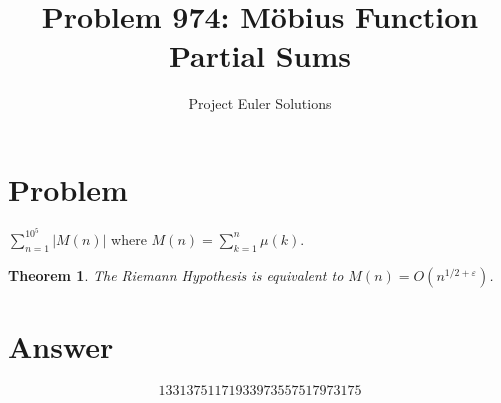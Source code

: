 \documentclass[11pt]{article}
\title{Problem 974: M\"obius Function Partial Sums}
\author{Project Euler Solutions}
\date{}
\newtheorem{theorem}{Theorem}
\begin{document}
\maketitle
\section{Problem}
$\sum_{n=1}^{10^5} |M(n)|$ where $M(n) = \sum_{k=1}^{n}\mu(k)$.
\begin{theorem}
The Riemann Hypothesis is equivalent to $M(n) = O(n^{1/2+\varepsilon})$.
\end{theorem}
\section{Answer}

\[
\boxed{13313751171933973557517973175}
\]
\end{document}
